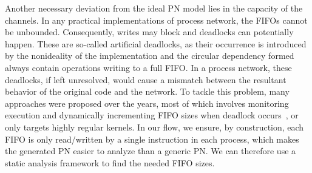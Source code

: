 \documentclass{sig-alternate}
\begin{document}
Another necessary deviation from the ideal PN model lies in the capacity of the channels.
In any practical implementations of process network, the FIFOs cannot be unbounded.
Consequently, writes may block and deadlocks can potentially happen. 
These are so-called artificial deadlocks, as their occurrence is introduced by the nonideality of the implementation and the circular dependency formed %
always contain operations writing to a full FIFO.
In a process network, %
these deadlocks, if left unresolved, would cause a mismatch between
the resultant behavior of the original code and the network. To tackle this problem, many approaches were proposed over the years, most of which involves monitoring execution and dynamically incrementing FIFO sizes when deadlock occurs~\cite{parks1995bounded}\cite{Geilen:2003:REK:1765712.1765736}\cite{4217338},
or only targets highly regular kernels.
In our flow, we ensure, by construction, each FIFO is only read/written by a single instruction in each process, which makes the generated PN easier to analyze than a generic PN. We can therefore use a static analysis framework to find the needed FIFO sizes.

\end{document}
